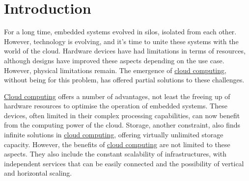 %


\chapter{Introduction}
\label{chap:introduction}

For a long time, embedded systems evolved in silos, isolated from each other. However, technology is evolving, and it's time to unite these systems with the world of the \gls{cloud}. Hardware devices have had limitations in terms of resources, although designs have improved these aspects depending on the use case. However, physical limitations remain. The emergence of \hyperref[subsec:cloudcomputing]{cloud computing}, without being for this problem, has offered partial solutions to these challenges.

\hyperref[subsec:cloudcomputing]{Cloud computing} offers a number of advantages, not least the freeing up of hardware resources to optimise the operation of embedded systems. These devices, often limited in their complex processing capabilities, can now benefit from the computing power of the \gls{cloud}. Storage, another constraint, also finds infinite solutions in \hyperref[subsec:cloudcomputing]{cloud computing}, offering virtually unlimited storage capacity. However, the benefits of \hyperref[subsec:cloudcomputing]{cloud computing} are not limited to these aspects. They also include the constant scalability of infrastructures, with independent services that can be easily connected and the possibility of vertical and horizontal scaling.

